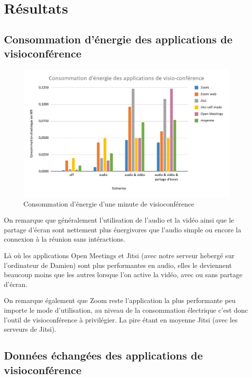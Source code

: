 \documentclass[11pt,a4paper]{report}
\begin{document}
\chapter{Résultats}

\section{Consommation d’énergie des applications de visioconférence}

\begin{figure}[h]
  \centering
  \includegraphics[width=1\linewidth]{graph_energie.pdf}
  \caption{Consommation d'énergie d'une minute de visioconférence}
  \label{fig:graph_energie}
\end{figure}

On remarque que généralement l'utilisation de l'audio et la vidéo ainsi que le partage d'écran sont nettement plus énergivores que l'audio simple ou encore la connexion à la réunion sans intéractions.

Là où les applications Open Meetings et Jitsi (avec notre serveur hebergé sur l'ordinateur de Damien) sont plus performantes en audio, elles le deviennent beaucoup moins que les autres lorsque l'on active la vidéo, avec ou sans partage d'écran.

On remarque également que Zoom reste l'application la plus performante peu importe le mode d'utilisation, au niveau de la consommation électrique c'est donc l'outil de visioconférence à privilégier. La pire étant en moyenne Jitsi (avec les serveurs de Jitsi).


\section{Données échangées des applications de visioconférence}
\end{document}

